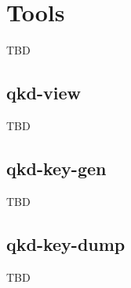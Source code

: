 \chapter{Tools}
\label{chap:Tools}

TBD

\section{qkd-view}
\label{sec:qkd-view}

TBD

\section{qkd-key-gen}
\label{sec:qkd-key-gen}

TBD

\section{qkd-key-dump}
\label{sec:qkd-key-dump}

TBD
